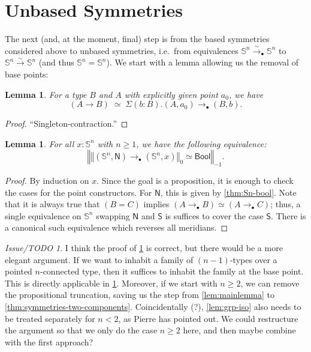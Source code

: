\documentclass[11pt,a4paper,oneside,reqno]{amsart}
\newtheorem{lemma}[theorem]{Lemma}
\theoremstyle{definition}
\theoremstyle{remark}
\newtheorem{issue}[theorem]{Issue/TODO}
\newcommand{\sph}[1]{{\mathbb S}^{#1}}
\newcommand{\trunc}[2]{\mathopen{}\left\Vert #2\right\Vert_{#1}\mathclose{}}
\newcommand{\North}{\mathsf N}
\newcommand{\South}{\mathsf S}
\begin{document}
\section{Unbased Symmetries}

The next (and, at the moment, final) step is from the based symmetries considered above to unbased symmetries, i.e.\ from equivalences $\sph n \xrightarrow{\sim}_\bullet \sph n$ to $\sph n \xrightarrow{\sim} \sph n$ (and thus $\sph n = \sph n$).
We start with a lemma allowing us the removal of base points:
\begin{lemma} \label{lem:rm-base-points}
 For a type $B$ and $A$ with explicitly given point $a_0$, we have
 \begin{equation}
  (A \to B) \; \simeq  \; \Sigma (b : B). (A,a_0) \to_\bullet (B,b).
 \end{equation}
\end{lemma}
\begin{proof}
 ``Singleton-contraction.''
\end{proof}


\begin{lemma} \label{lem:eqv-to-bool}
 For all $x : \sph n$ with $n \geq 1$, we have the following equivalence:
 \begin{equation}
  \trunc {-1} {\trunc 0 {(\sph n, \North) \to_\bullet (\sph n, x)} \simeq \mathsf{Bool}}.
 \end{equation}
\end{lemma}
\begin{proof}
 By induction on $x$.
 Since the goal is a proposition, it is enough to check the cases for the point constructors. For $\North$, this is given by 
 \cref{thm:Sn-bool}. Note that it is always true that $(B = C)$ implies $(A \to_\bullet B) \simeq (A \to_\bullet C)$;
 thus, a single equivalence on $\sph n$ swapping $\North$ and $\South$ is suffices to cover the case $\South$.
 There is a canonical such equivalence which reverses all meridians.
\end{proof}


\begin{issue}
 I think the proof of \cref{lem:eqv-to-bool} is correct, but there would be a more elegant argument.
 If we want to inhabit a family of $(n-1)$-types over a pointed $n$-connected type, then it suffices to inhabit the family at the base point. This is directly applicable in \cref{lem:eqv-to-bool}. Moreover, if we start with $n \geq 2$, we can remove the propositional truncation, saving us the step from \cref{lem:mainlemma} to \cref{thm:symmetries-two-components}.
 Coincidentally (?), \cref{lem:grp-iso} also needs to be treated separately for $n < 2$, as Pierre has pointed out.
 We could restructure the argument so that we only do the case $n \geq 2$ here, and then maybe combine with the first approach?
\end{issue}
\end{document}
